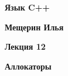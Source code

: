 \documentclass{article}
\begin{document}
	
\begin{center}
	\begin{LARGE}
		\textbf{Язык C++}
	\end{LARGE}
\end{center}
\begin{center}
	\begin{normalsize}
		\textbf{Мещерин Илья}
	\end{normalsize}
\end{center}
\begin{center}
	\begin{Large}
		\textbf{Лекция 12}
	\end{Large}
\end{center}
\begin{center}
	\begin{large}
		\textbf{Аллокаторы}
	\end{large}
\end{center}
\end{document}
